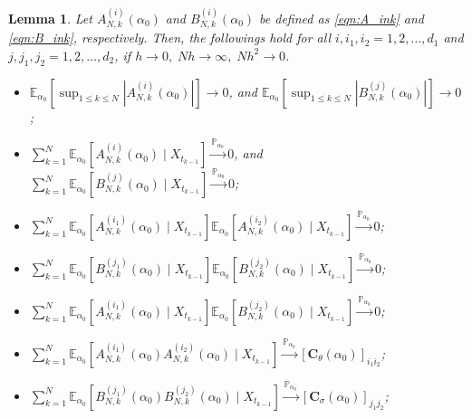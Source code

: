 \documentclass[a4paper,12pt]{article}
\numberwithin{equation}{section}
\theoremstyle{plain}
\newtheorem{lemma}[theorem]{Lemma}
\theoremstyle{definition}
\begin{document}
\begin{appendix}
\begin{lemma}\label{lemma:normality conditions}
    Let $A^{(i)}_{N,k}(\alpha_0)$ and $B^{(i)}_{N,k}(\alpha_0)$ be defined as \eqref{eqn:A_ink} and \eqref{eqn:B_ink}, respectively. Then, the followings hold for all $i,i_1,i_2=1,2,\dots,d_1$ and $j,j_1,j_2=1,2,\dots,d_2$, if $h\to 0,\;Nh\to \infty,\; Nh^2\to 0$.
    \begin{itemize}
        \item[(i)]$\mathbb{E}_{\alpha_0}\left[\sup _{1 \leq k \leq N}\left|A_{N, k}^{(i)}\left(\alpha_0\right)\right|\right] \longrightarrow 0$, and $\mathbb{E}_{\alpha_0}\left[\sup _{1 \leq k \leq N}\left|B_{N, k}^{(j)}\left(\alpha_0\right)\right|\right] \longrightarrow 0 $;
        \item[(ii)]$\sum_{k=1}^N \mathbb{E}_{\alpha_0}\left[A_{N, k}^{(i)}\left(\alpha_0\right) \mid X_{t_{k-1}}\right] \xrightarrow{\mathbb{P}_{\alpha_0}} 0$, and $\sum_{k=1}^N \mathbb{E}_{\alpha_0}\left[B_{N, k}^{(j)}\left(\alpha_0\right) \mid X_{t_{k-1}}\right] \xrightarrow{\mathbb{P}_{\alpha_0}} 0 $;
        \item[(iii)]$\sum_{k=1}^N \mathbb{E}_{\alpha_0}\left[A_{N, k}^{\left(i_1\right)}\left(\alpha_0\right) \mid X_{t_{k-1}}\right] \mathbb{E}_{\alpha_0}\left[A_{N, k}^{\left(i_2\right)}\left(\alpha_0\right) \mid X_{t_{k-1}}\right] \xrightarrow{\mathbb{P}_{\alpha_0}} 0$;
        \item[(iv)] $\sum_{k=1}^N \mathbb{E}_{\alpha_0}\left[B_{N, k}^{\left(j_1\right)}\left(\alpha_0\right) \mid X_{t_{k-1}}\right] \mathbb{E}_{\alpha_0}\left[B_{N, k}^{\left(j_2\right)}\left(\alpha_0\right) \mid X_{t_{k-1}}\right] \xrightarrow{\mathbb{P}_{\alpha_0}} 0$;
        \item[(v)]$\sum_{k=1}^N \mathbb{E}_{\alpha_0}\left[A_{N, k}^{\left(i_1\right)}\left(\alpha_0\right) \mid X_{t_{k-1}}\right] \mathbb{E}_{\alpha_0}\left[B_{N, k}^{\left(j_2\right)}\left(\alpha_0\right) \mid X_{t_{k-1}}\right] \xrightarrow{\mathbb{P}_{\alpha_0}} 0$;
        \item[(vi)]$\sum_{k=1}^N \mathbb{E}_{\alpha_0}\left[A_{N, k}^{\left(i_1\right)}\left(\alpha_0\right) A_{N, k}^{\left(i_2\right)}\left(\alpha_0\right) \mid X_{t_{k-1}}\right] \xrightarrow{\mathbb{P}_{\alpha_0}}\left[\mathbf{C}_{\theta}(\alpha_0)\right]_{i_1i_2}$;
        \item[(vii)] $\sum_{k=1}^N \mathbb{E}_{\alpha_0}\left[B_{N, k}^{\left(j_1\right)}\left(\alpha_0\right) B_{N, k}^{\left(j_2\right)}\left(\alpha_0\right) \mid X_{t_{k-1}}\right] \xrightarrow{\mathbb{P}_{\alpha_0}}\left[\mathbf{C}_{\sigma}(\alpha_0)\right]_{j_1j_2}$;

\end{itemize}
\end{lemma}
\end{appendix}
\end{document}
